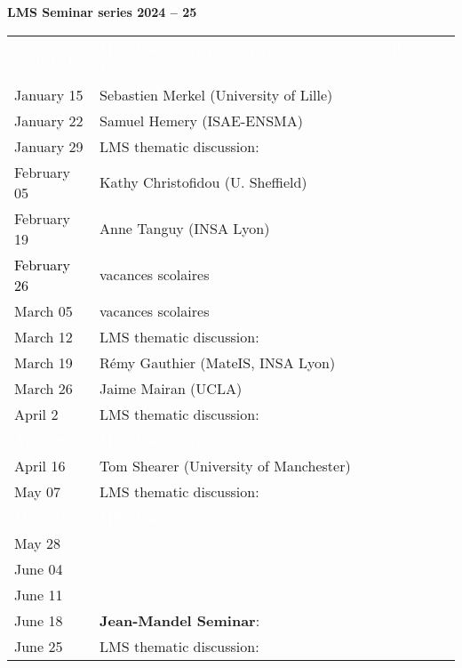\documentclass[a4paper,11pt,fleqn]{article}
\begin{document}
	\sffamily
	\thispagestyle{titlepage}
	\vspace*{-3em}
	\begin{center}
		\huge \textbf{LMS Seminar series 2024 -- 25}
	\end{center}
	\vspace*{-3em}
	\begin{center}
		\Large 
		\begin{tabular}{| p{3.5cm} p{14cm} |}
			\hline
			\rowcolor{docColor!99}
			\textcolor{white}{January 08} & \textcolor{white}{MECA seminar: Thao (Vicky) Nguyen (Johns Hopkins University)} \\
			January 15 & Sebastien Merkel (University of Lille) \\
			January 22 & Samuel Hemery (ISAE-ENSMA) \\
			\rowcolor{cyan}
			January 29 & LMS thematic discussion:~ \\
			February 05 & Kathy Christofidou (U. Sheffield)  \\
			February 19 & Anne Tanguy (INSA Lyon) \\
			\textcolor{black}{February 26} & {vacances scolaires} \\
			{March 05} & {vacances scolaires} \\
			\rowcolor{cyan}
			March 12 & LMS thematic discussion:~  \\
			\rowcolor{white}
			March 19 & R{\'e}my Gauthier (MateIS, INSA Lyon) \\
			March 26 & Jaime Mairan (UCLA)  \\
			\rowcolor{cyan}
			April 2 & LMS thematic discussion:~ \\
			\rowcolor{docColor!99}
			\textcolor{white}{April 09} & \textcolor{white}{MECA seminar: } \\
			April 16 & Tom Shearer (University of Manchester) \\
			\rowcolor{cyan}
			May 07 &  LMS thematic discussion:~ \\
			\rowcolor{docColor!99}
			\textcolor{white}{May 21} & \textcolor{white}{MECA seminar: } \\
			May 28 & \\
			June 04 &  \\
			June 11 & \\
			June 18 &  \textbf{Jean-Mandel Seminar}:\\ 
			\rowcolor{cyan}
			June 25 & LMS thematic discussion:~\\
			\hline
		\end{tabular}
	\end{center}
	
\end{document}
